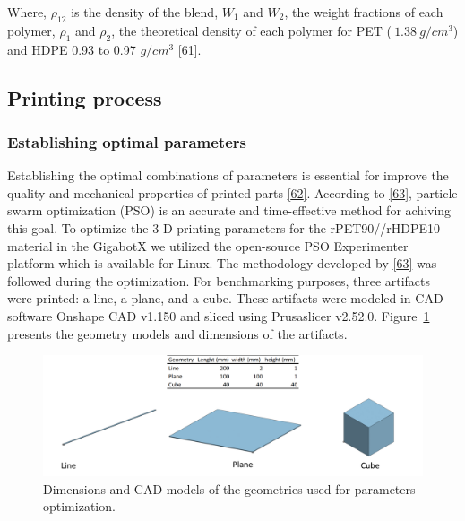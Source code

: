 \documentclass[
]{article}
\begin{document}
Where, \(\rho_{12}\) is the density of the blend, \(W_{1}\) and
\(W_{2}\), the weight fractions of each polymer, \(\rho_{1}\) and
\(\rho_{2}\), the theoretical density of each polymer for PET
(\(~1.38~g/cm^{3}\)) and HDPE 0.93 to 0.97 \(g/cm^{3}\)
\protect\hyperlink{ref-jonathanguidigo12017}{{[}61{]}}.

\hypertarget{printing-process}{%
\subsection{Printing process}\label{printing-process}}

\hypertarget{establishing-optimal-parameters}{%
\subsubsection{Establishing optimal
parameters}\label{establishing-optimal-parameters}}

Establishing the optimal combinations of parameters is essential for
improve the quality and mechanical properties of printed parts
\protect\hyperlink{ref-jaisinghsheoran2020}{{[}62{]}}. According to
\protect\hyperlink{ref-oberloier2022}{{[}63{]}}, particle swarm
optimization (PSO) is an accurate and time-effective method for achiving
this goal. To optimize the 3-D printing parameters for the
rPET90//rHDPE10 material in the GigabotX we utilized the open-source PSO
Experimenter platform which is available for Linux. The methodology
developed by \protect\hyperlink{ref-oberloier2022}{{[}63{]}} was
followed during the optimization. For benchmarking purposes, three
artifacts were printed: a line, a plane, and a cube. These artifacts
were modeled in CAD software Onshape CAD v1.150 and sliced using
Prusaslicer v2.52.0. Figure~\ref{fig-cad} presents the geometry models
and dimensions of the artifacts.

\begin{figure}

{\centering \includegraphics{figures/Figure-2.png}

}

\caption{\label{fig-cad}Dimensions and CAD models of the geometries used
for parameters optimization.}

\end{figure}
\end{document}
